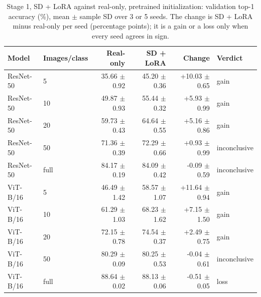 \begin{table}[H]
\centering
\caption{Stage 1, SD + LoRA against real-only, pretrained initialization: validation top-1 accuracy (\%), mean $\pm$ sample SD over 3 or 5 seeds. The change is SD + LoRA minus real-only per seed (percentage points); it is a gain or a loss only when every seed agrees in sign.}
\label{tab:stage1-pretrained-accuracy-sd_lora}
\begin{tabular}{llrrrl}
\toprule
Model & Images/class & Real-only & SD + LoRA & Change & Verdict \\
\midrule
ResNet-50 & 5 & 35.66 $\pm$ 0.92 & 45.20 $\pm$ 0.36 & +10.03 $\pm$ 0.65 & gain \\
ResNet-50 & 10 & 49.87 $\pm$ 0.93 & 55.44 $\pm$ 0.32 & +5.93 $\pm$ 0.99 & gain \\
ResNet-50 & 20 & 59.73 $\pm$ 0.43 & 64.64 $\pm$ 0.55 & +5.16 $\pm$ 0.86 & gain \\
ResNet-50 & 50 & 71.36 $\pm$ 0.39 & 72.29 $\pm$ 0.66 & +0.93 $\pm$ 0.99 & inconclusive \\
ResNet-50 & full & 84.17 $\pm$ 0.19 & 84.09 $\pm$ 0.42 & -0.09 $\pm$ 0.59 & inconclusive \\
\midrule
ViT-B/16 & 5 & 46.49 $\pm$ 1.42 & 58.57 $\pm$ 1.07 & +11.64 $\pm$ 0.94 & gain \\
ViT-B/16 & 10 & 61.29 $\pm$ 1.03 & 68.23 $\pm$ 1.62 & +7.15 $\pm$ 1.50 & gain \\
ViT-B/16 & 20 & 72.15 $\pm$ 0.78 & 74.54 $\pm$ 0.37 & +2.49 $\pm$ 0.75 & gain \\
ViT-B/16 & 50 & 80.29 $\pm$ 0.09 & 80.25 $\pm$ 0.53 & -0.04 $\pm$ 0.61 & inconclusive \\
ViT-B/16 & full & 88.64 $\pm$ 0.02 & 88.13 $\pm$ 0.06 & -0.51 $\pm$ 0.05 & loss \\
\bottomrule
\end{tabular}
\end{table}
